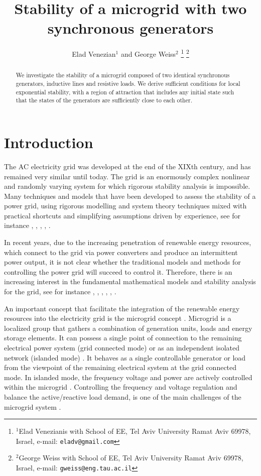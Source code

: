 \documentclass[letterpaper, 10 pt, conference]{ieeeconf}
\title{\LARGE \bf
Stability of a microgrid with two synchronous generators}
\author{Elad Venezian$^{1}$ and George Weiss$^{2}$%
\thanks{$^{1}$Elad Venezianis with School of EE,
        Tel Aviv University Ramat Aviv 69978, Israel,
        e-mail: {\tt\small eladv@gmail.com}}%
\thanks{$^{2}$George Weiss with School of EE,
        Tel Aviv University Ramat Aviv 69978, Israel,
        e-mail: {\tt\small gweiss@eng.tau.ac.il}}}
\begin{document}
\maketitle
\thispagestyle{empty}
\pagestyle{empty}

\begin{abstract}
We investigate the stability of a microgrid composed of two identical
synchronous generators, inductive lines and resistive loads. We 
derive sufficient conditions for local exponential stability, with 
a region of attraction that includes any initial state such that the 
states of the generators are sufficiently close to each other. 
\end{abstract}

\section{Introduction}

The AC electricity grid was developed at the end of the XIXth century,
and has remained very similar until today. The grid is an enormously
complex nonlinear and randomly varying system for which rigorous
stability analysis is impossible. Many techniques and models that have
been developed to assess the stability of a power grid, using rigorous
modelling and system theory techniques mixed with practical shortcuts
and simplifying assumptions driven by experience, see for instance
\cite{Kundur}, \cite{GrSt2014}, \cite{SauerPai1998}, \cite{GOBS:03},
\cite{DoBull:12}.

In recent years, due to the increasing penetration of renewable energy
resources, which connect to the grid via power converters and produce
an intermittent power output, it is not clear whether the traditional
models and methods for controlling the power grid will succeed to
control it. Therefore, there is an increasing interest in the
fundamental mathematical models and stability analysis for the grid,
see for instance \cite{DoBull:12}, \cite{PoDoBu:13}, \cite{CaTa:14},
\cite{NaWe:14}, \cite{NaWe:15}, \cite{DePersiSchaft:16}.

An important concept that facilitate the integration of the renewable energy resources into the electricity grid is the microgrid concept \cite{GreenProdanovic:07}. Microgrid is a localized group that gathers a combination of generation units, loads and energy storage elements. It can possess a single point of connection to the remaining electrical power system (grid connected mode) or as an independent isolated network (islanded mode) . It behaves as a single controllable generator or load from the  viewpoint of the remaining electrical system at the grid connected mode. In islanded mode, the frequency voltage and power are actively controlled within the microgrid  \cite{schiffer2016survey}.  Controlling the frequency and voltage regulation and balance the active/reactive load demand, is one of the main challenges of the microgrid system \cite{shafiee2016multi}.
\end{document}
